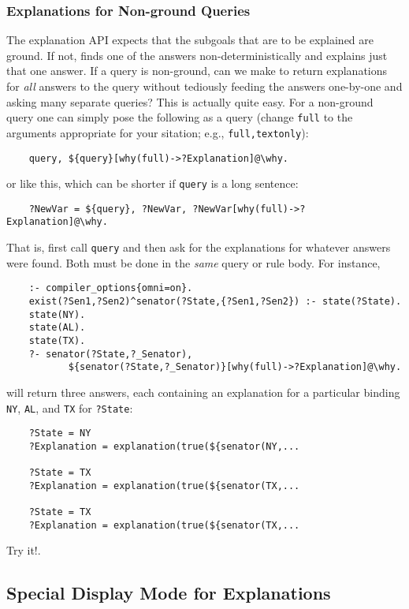 \subsubsection{Explanations for Non-ground Queries}

The explanation API expects that the subgoals that are to be explained are
ground. If not, \ERGO finds one of the answers non-deterministically
and explains just that one answer.  If a query is non-ground,
can we make \ERGO to return
explanations for \emph{all} answers to the query without tediously
feeding the answers one-by-one and asking many separate queries? This is actually quite easy. For a
non-ground query one can simply pose the following
as a query (change \texttt{full} to the arguments appropriate for your
sitation; e.g., \texttt{full,textonly}):
\begin{verbatim}
    query, ${query}[why(full)->?Explanation]@\why.
\end{verbatim}
or like this, which can be shorter if \texttt{query} is a long sentence:
\begin{verbatim}
    ?NewVar = ${query}, ?NewVar, ?NewVar[why(full)->?Explanation]@\why.
\end{verbatim}
That is, first call \texttt{query} and then ask for the explanations for
whatever answers were found. Both must be done in the \emph{same} query or
rule body. 
For instance,
\begin{verbatim}
    :- compiler_options{omni=on}.
    exist(?Sen1,?Sen2)^senator(?State,{?Sen1,?Sen2}) :- state(?State).
    state(NY).
    state(AL).
    state(TX).
    ?- senator(?State,?_Senator),
           ${senator(?State,?_Senator)}[why(full)->?Explanation]@\why.
\end{verbatim}
will return three answers, each containing an explanation for a particular
binding \texttt{NY}, \texttt{AL}, and \texttt{TX} for \texttt{?State}:
\begin{verbatim}
    ?State = NY
    ?Explanation = explanation(true(${senator(NY,...

    ?State = TX
    ?Explanation = explanation(true(${senator(TX,...

    ?State = TX
    ?Explanation = explanation(true(${senator(TX,...
\end{verbatim}
Try it!.


\subsection{Special Display Mode for Explanations}\label{sec-expl-display}

